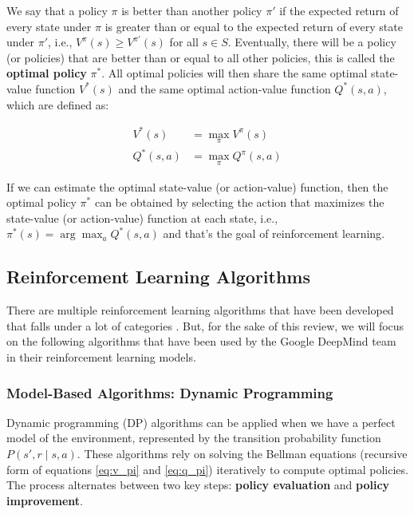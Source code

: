 We say that a policy $\pi$ is better than another policy $\pi'$ if the expected
return of every state under $\pi$ is greater than or equal to the expected
return of every state under $\pi'$, i.e., $V^\pi(s) \geq V^{\pi'}(s)$ for all
$s \in S$. Eventually, there will be a policy (or policies) that are better
than or equal to all other policies, this is called the \textbf{optimal policy}
$\pi^*$. All optimal policies will then share the same optimal state-value
function $V^*(s)$ and the same optimal action-value function $Q^*(s, a)$, which
are defined as:

\begin{equation}
    \begin{split}
        V^*(s)    & = \max_\pi V^\pi(s)    \\
        Q^*(s, a) & = \max_\pi Q^\pi(s, a)
    \end{split}
\end{equation}

If we can estimate the optimal state-value (or action-value) function, then the
optimal policy $\pi^*$ can be obtained by selecting the action that maximizes
the state-value (or action-value) function at each state, i.e., $\pi^*(s) =
    \arg\max_a Q^*(s, a)$ and that's the goal of reinforcement learning\cite{bg2}.

\subsection{Reinforcement Learning Algorithms}
There are multiple reinforcement learning algorithms that have been developed
that falls under a lot of categories \cite{bg3}. But, for the sake of this review, we will
focus on the following algorithms that have been used by the Google DeepMind
team in their reinforcement learning models.\\

\subsubsection{\textbf{Model-Based Algorithms: Dynamic Programming}}

\hspace{1em} Dynamic programming (DP) algorithms can be applied when we have a perfect model
of the environment, represented by the transition probability function \( P(s',
r \mid s, a) \). These algorithms rely on solving the Bellman equations
(recursive form of equations \ref{eq:v_pi} and \ref{eq:q_pi}) iteratively to
compute optimal policies. The process alternates between two key steps:
\textbf{policy evaluation} and \textbf{policy improvement}.

